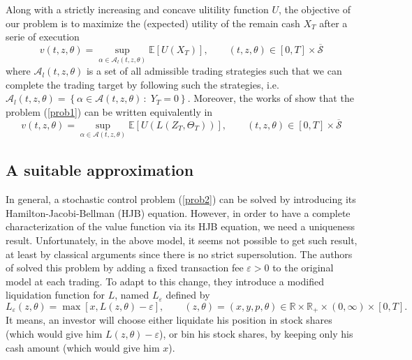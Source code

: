 \documentclass[a4paper,10pt]{article}
\newcommand{\bequ}{\begin{equation}}
\newcommand{\eequ}{\end{equation}}
\begin{document}
Along with a strictly increasing and concave ulitility function $U$, the objective of our problem is to maximize the (expected) utility of the remain cash $X_T$ after a serie of execution
\bequ
\label{prob1}
v(t, z, \theta) = \sup\limits_{\alpha \in \mathcal{A}_l(t,z,\theta)}\mathbb{E}\left[U\left(X_T\right)\right], \qquad \left( {t,z,\theta } \right) \in \left[ {0,T} \right] \times \overline {\mathcal{S}}
\eequ
where $\mathcal{A}_l(t,z,\theta)$ is a set of all admissible trading strategies such that we can complete the trading target by following such the strategies, i.e. $\mathcal{A}_l(t,z,\theta) = \left\{\alpha \in \mathcal{A}(t,z,\theta) \, : \; Y_T = 0\right\}$. Moreover, the works of \cite{KP} show that the problem (\ref{prob1}) can be written equivalently in
\bequ
\label{prob2}
v(t, z, \theta) = \sup\limits_{\alpha \in \mathcal{A}(t,z,\theta)}\mathbb{E}\left[U\left(L\left(Z_T, \Theta_T\right)\right)\right], \qquad \left( {t,z,\theta } \right) \in \left[ {0,T} \right] \times \overline {\mathcal{S}}
\eequ
\subsection{A suitable approximation}
\par In general, a stochastic control problem (\ref{prob2}) can be solved by introducing its Hamilton-Jacobi-Bellman (HJB) equation. However, in order to have a complete characterization of the value function via its HJB equation, we need a uniqueness result. Unfortunately, in the above model, it seems not possible to get such result, at least by classical arguments since there is no strict supersolution. The authors of \cite{KP} solved this problem by adding a fixed transaction fee $\varepsilon > 0$ to the original model at each trading. To adapt to this change, they introduce a modified liquidation function for $L$, named $L_{\varepsilon}$ defined by
\[
L_\varepsilon (z, \theta) = \max \left[x, L(z, \theta) - \varepsilon\right], \qquad (z, \theta) = (x, y, p, \theta) \in \mathbb{R}\times\mathbb{R}_+\times (0,\infty)\times [0, T].
\] 
It means, an investor will choose either liquidate his position in stock shares (which would give him $L(z, \theta) - \varepsilon$), or bin his stock shares, by keeping only his cash amount (which would give him $x$). 
\end{document}
